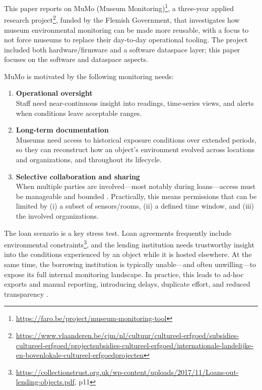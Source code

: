 This paper reports on MuMo (Museum
Monitoring)\footnote{\url{https://faro.be/project/museum-monitoring-tool}},
a three-year applied research
project\footnote{\url{https://www.vlaanderen.be/cjm/nl/cultuur/cultureel-erfgoed/subsidies-cultureel-erfgoed/projectsubsidies-cultureel-erfgoed/internationale-landelijke-en-bovenlokale-cultureel-erfgoedprojecten}},
funded by the Flemish Government, that investigates how museum
environmental monitoring can be made more reusable, with a focus to not
force museums to replace their day-to-day operational tooling. The
project included both hardware/firmware and a software dataspace layer;
this paper focuses on the software and dataspace aspects.

MuMo is motivated by the following monitoring needs:

\begin{enumerate}
\def\labelenumi{\arabic{enumi}.}
\tightlist
\item
  \textbf{Operational oversight}\\
  Staff need near-continuous insight into readings, time-series views,
  and alerts when conditions leave acceptable ranges.
\item
  \textbf{Long-term documentation}\\
  Museums need access to historical exposure conditions over extended
  periods, so they can reconstruct how an object's environment evolved
  across locations and organizations, and throughout its lifecycle.
\item
  \textbf{Selective collaboration and sharing}\\
  When multiple parties are involved---most notably during
  loans---access must be manageable and bounded \cite{hu2014guide}.
  Practically, this means permissions that can be limited by (i) a
  subset of sensors/rooms, (ii) a defined time window, and (iii) the
  involved organizations.
\end{enumerate}

The loan scenario is a key stress test. Loan agreements frequently
include environmental
constraints\footnote{\url{https://collectionstrust.org.uk/wp-content/uploads/2017/11/Loans-out-lending-objects.pdf}, p11},
and the lending institution needs trustworthy insight into the
conditions experienced by an object while it is hosted elsewhere. At the
same time, the borrowing institution is typically unable---and often
unwilling---to expose its full internal monitoring landscape. In
practice, this leads to ad-hoc exports and manual reporting, introducing
delays, duplicate effort, and reduced transparency
\cite{halevy2006principles, franklin2005databases}.

